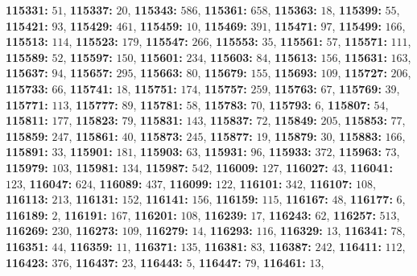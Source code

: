 \textsf{\bfseries 115331:} $51$, \textsf{\bfseries 115337:} $20$, \textsf{\bfseries 115343:} $586$, \textsf{\bfseries 115361:} $658$, \textsf{\bfseries 115363:} $18$, \textsf{\bfseries 115399:} $55$, \textsf{\bfseries 115421:} $93$, \textsf{\bfseries 115429:} $461$, \textsf{\bfseries 115459:} $10$, \textsf{\bfseries 115469:} $391$, \textsf{\bfseries 115471:} $97$, \textsf{\bfseries 115499:} $166$, \textsf{\bfseries 115513:} $114$, \textsf{\bfseries 115523:} $179$, \textsf{\bfseries 115547:} $266$, \textsf{\bfseries 115553:} $35$, \textsf{\bfseries 115561:} $57$, \textsf{\bfseries 115571:} $111$, \textsf{\bfseries 115589:} $52$, \textsf{\bfseries 115597:} $150$, \textsf{\bfseries 115601:} $234$, \textsf{\bfseries 115603:} $84$, \textsf{\bfseries 115613:} $156$, \textsf{\bfseries 115631:} $163$, \textsf{\bfseries 115637:} $94$, \textsf{\bfseries 115657:} $295$, \textsf{\bfseries 115663:} $80$, \textsf{\bfseries 115679:} $155$, \textsf{\bfseries 115693:} $109$, \textsf{\bfseries 115727:} $206$, \textsf{\bfseries 115733:} $66$, \textsf{\bfseries 115741:} $18$, \textsf{\bfseries 115751:} $174$, \textsf{\bfseries 115757:} $259$, \textsf{\bfseries 115763:} $67$, \textsf{\bfseries 115769:} $39$, \textsf{\bfseries 115771:} $113$, \textsf{\bfseries 115777:} $89$, \textsf{\bfseries 115781:} $58$, \textsf{\bfseries 115783:} $70$, \textsf{\bfseries 115793:} $6$, \textsf{\bfseries 115807:} $54$, \textsf{\bfseries 115811:} $177$, \textsf{\bfseries 115823:} $79$, \textsf{\bfseries 115831:} $143$, \textsf{\bfseries 115837:} $72$, \textsf{\bfseries 115849:} $205$, \textsf{\bfseries 115853:} $77$, \textsf{\bfseries 115859:} $247$, \textsf{\bfseries 115861:} $40$, \textsf{\bfseries 115873:} $245$, \textsf{\bfseries 115877:} $19$, \textsf{\bfseries 115879:} $30$, \textsf{\bfseries 115883:} $166$, \textsf{\bfseries 115891:} $33$, \textsf{\bfseries 115901:} $181$, \textsf{\bfseries 115903:} $63$, \textsf{\bfseries 115931:} $96$, \textsf{\bfseries 115933:} $372$, \textsf{\bfseries 115963:} $73$, \textsf{\bfseries 115979:} $103$, \textsf{\bfseries 115981:} $134$, \textsf{\bfseries 115987:} $542$, \textsf{\bfseries 116009:} $127$, \textsf{\bfseries 116027:} $43$, \textsf{\bfseries 116041:} $123$, \textsf{\bfseries 116047:} $624$, \textsf{\bfseries 116089:} $437$, \textsf{\bfseries 116099:} $122$, \textsf{\bfseries 116101:} $342$, \textsf{\bfseries 116107:} $108$, \textsf{\bfseries 116113:} $213$, \textsf{\bfseries 116131:} $152$, \textsf{\bfseries 116141:} $156$, \textsf{\bfseries 116159:} $115$, \textsf{\bfseries 116167:} $48$, \textsf{\bfseries 116177:} $6$, \textsf{\bfseries 116189:} $2$, \textsf{\bfseries 116191:} $167$, \textsf{\bfseries 116201:} $108$, \textsf{\bfseries 116239:} $17$, \textsf{\bfseries 116243:} $62$, \textsf{\bfseries 116257:} $513$, \textsf{\bfseries 116269:} $230$, \textsf{\bfseries 116273:} $109$, \textsf{\bfseries 116279:} $14$, \textsf{\bfseries 116293:} $116$, \textsf{\bfseries 116329:} $13$, \textsf{\bfseries 116341:} $78$, \textsf{\bfseries 116351:} $44$, \textsf{\bfseries 116359:} $11$, \textsf{\bfseries 116371:} $135$, \textsf{\bfseries 116381:} $83$, \textsf{\bfseries 116387:} $242$, \textsf{\bfseries 116411:} $112$, \textsf{\bfseries 116423:} $376$, \textsf{\bfseries 116437:} $23$, \textsf{\bfseries 116443:} $5$, \textsf{\bfseries 116447:} $79$, \textsf{\bfseries 116461:} $13$, 
